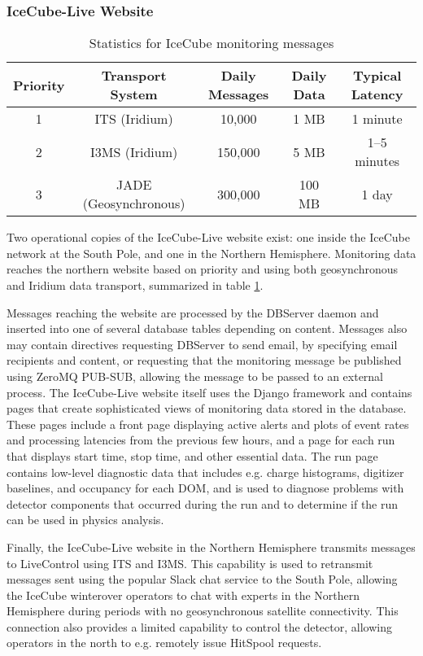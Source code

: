 \subsubsection{IceCube-Live Website}

\begin{table}[!ht]
\begin{tabular}{|c|c|c|c|c|}
\hline
Priority & Transport System & Daily Messages & Daily Data & Typical Latency\\
\hline
1 & ITS (Iridium) & 10,000 & 1 MB & 1 minute \\
\hline
2 & I3MS (Iridium) & 150,000 & 5 MB & 1--5 minutes \\
\hline
3 & JADE (Geosynchronous) & 300,000 & 100 MB & 1 day \\
\hline
\end{tabular}
\caption{Statistics for IceCube monitoring messages}
\label{i3messages}
\end{table}

Two operational copies of the IceCube-Live website exist: one inside the IceCube network at the South Pole, and
one in the Northern Hemisphere.  Monitoring data reaches the northern website based on priority and using
both geosynchronous and Iridium data transport, summarized in table \ref{i3messages}.

Messages reaching the website are processed by the DBServer daemon and inserted into one of several database tables depending on content.
Messages also may contain directives requesting DBServer to send email, by specifying email recipients and content,
or requesting that the monitoring message be published using ZeroMQ PUB-SUB, allowing the message to be passed to an external process.  The IceCube-Live
website itself uses the Django framework and contains pages that create sophisticated views of monitoring data stored in the database.
These pages include a front page displaying active alerts and plots of event rates and processing latencies from the previous few hours, and
a page for each run that displays start time, stop time, and other essential data.  The run page contains low-level diagnostic data that
includes e.g. charge histograms, digitizer baselines, and occupancy for each DOM, and is used to diagnose problems with detector components
that occurred during the run and to determine if the run can be used in physics analysis.

Finally, the IceCube-Live website in the Northern Hemisphere transmits messages to LiveControl using ITS and I3MS.  This capability is used to retransmit
messages sent using the popular Slack chat service to the South Pole, allowing the IceCube winterover operators to chat with
experts in the Northern Hemisphere during periods with no geosynchronous satellite connectivity.  This connection also provides a limited
capability to control the detector, allowing operators in the north to e.g. remotely issue HitSpool requests.

